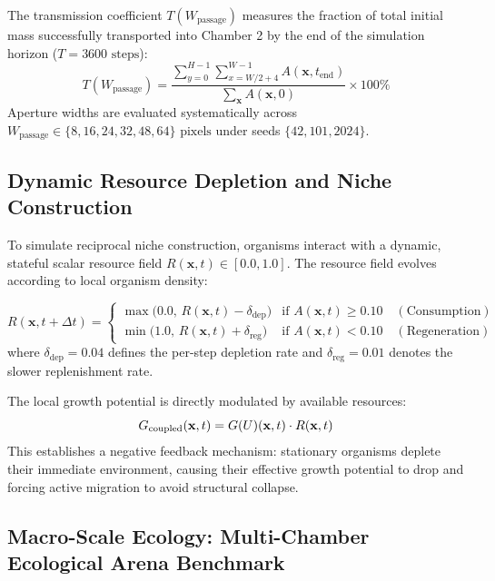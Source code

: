 The transmission coefficient $T(W_{\text{passage}})$ measures the fraction of total initial mass successfully transported into Chamber 2 by the end of the simulation horizon ($T = 3600\text{ steps}$):
\begin{equation}
T(W_{\text{passage}}) = \frac{\sum_{y=0}^{H-1} \sum_{x = W/2 + 4}^{W-1} A(\mathbf{x}, t_{\text{end}})}{\sum_{\mathbf{x}} A(\mathbf{x}, 0)} \times 100\%
\label{eq:transmission_coefficient_def}
\end{equation}
Aperture widths are evaluated systematically across $W_{\text{passage}} \in \{8, 16, 24, 32, 48, 64\}\text{ pixels}$ under seeds $\{42, 101, 2024\}$.

\subsection{Dynamic Resource Depletion and Niche Construction}
\label{subsec:exp_resource_depletion}

To simulate reciprocal niche construction, organisms interact with a dynamic, stateful scalar resource field $R(\mathbf{x}, t) \in [0.0, 1.0]$. The resource field evolves according to local organism density:

\begin{equation}
R(\mathbf{x}, t + \Delta t) = 
\begin{cases}
\max\Big(0.0, \, R(\mathbf{x}, t) - \delta_{\text{dep}}\Big) & \text{if } A(\mathbf{x}, t) \ge 0.10 \quad (\text{Consumption}) \\
\min\Big(1.0, \, R(\mathbf{x}, t) + \delta_{\text{reg}}\Big) & \text{if } A(\mathbf{x}, t) < 0.10 \quad (\text{Regeneration})
\end{cases}
\label{eq:resource_depletion_dynamics}
\end{equation}
where $\delta_{\text{dep}} = 0.04$ defines the per-step depletion rate and $\delta_{\text{reg}} = 0.01$ denotes the slower replenishment rate.

The local growth potential is directly modulated by available resources:
\begin{equation}
G_{\text{coupled}}(\mathbf{x}, t) = G(U)(\mathbf{x}, t) \cdot R(\mathbf{x}, t)
\label{eq:coupled_growth_depletion}
\end{equation}
This establishes a negative feedback mechanism: stationary organisms deplete their immediate environment, causing their effective growth potential to drop and forcing active migration to avoid structural collapse.

\subsection{Macro-Scale Ecology: Multi-Chamber Ecological Arena Benchmark}
\label{subsec:exp_colosseum_ecosystem}

